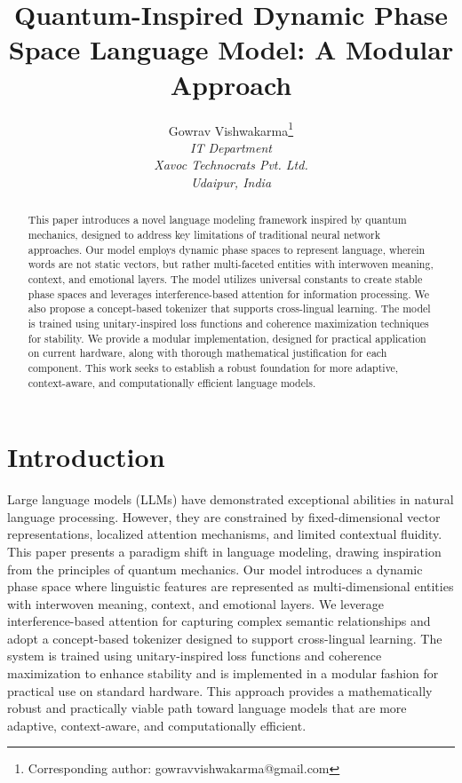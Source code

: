 \documentclass[11pt, a4paper]{article}
\title{Quantum-Inspired Dynamic Phase Space Language Model: A Modular Approach}
\author{
    Gowrav Vishwakarma\thanks{Corresponding author: gowravvishwakarma@gmail.com}\\
    \textit{IT Department}\\
    \textit{Xavoc Technocrats Pvt. Ltd.}\\
    \textit{Udaipur, India}
}
\date{}
\begin{document}
\maketitle

\begin{abstract}
This paper introduces a novel language modeling framework inspired by quantum mechanics, designed to address key limitations of traditional neural network approaches. Our model employs dynamic phase spaces to represent language, wherein words are not static vectors, but rather multi-faceted entities with interwoven meaning, context, and emotional layers. The model utilizes universal constants to create stable phase spaces and leverages interference-based attention for information processing. We also propose a concept-based tokenizer that supports cross-lingual learning. The model is trained using unitary-inspired loss functions and coherence maximization techniques for stability. We provide a modular implementation, designed for practical application on current hardware, along with thorough mathematical justification for each component. This work seeks to establish a robust foundation for more adaptive, context-aware, and computationally efficient language models.
\end{abstract}

\section{Introduction}

Large language models (LLMs) have demonstrated exceptional abilities in natural language processing. However, they are constrained by fixed-dimensional vector representations, localized attention mechanisms, and limited contextual fluidity. This paper presents a paradigm shift in language modeling, drawing inspiration from the principles of quantum mechanics. Our model introduces a dynamic phase space where linguistic features are represented as multi-dimensional entities with interwoven meaning, context, and emotional layers. We leverage interference-based attention for capturing complex semantic relationships and adopt a concept-based tokenizer designed to support cross-lingual learning. The system is trained using unitary-inspired loss functions and coherence maximization to enhance stability and is implemented in a modular fashion for practical use on standard hardware. This approach provides a mathematically robust and practically viable path toward language models that are more adaptive, context-aware, and computationally efficient.
\end{document}
